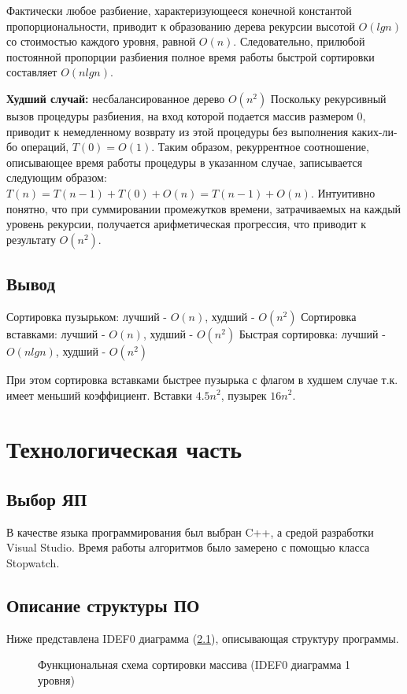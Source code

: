 \documentclass[12pt]{report}
\begin{document}
Фактически любое разбиение, характеризующееся конечной константой пропорциональности, приводит к образованию дерева рекурсии высотой $O(lgn)$ со стоимостью каждого уровня, равной $O(n)$. Следовательно, прилюбой постоянной пропорции разбиения полное время работы быстрой сортировки составляет $O(nlgn)$.

\textbf{Худший случай:} несбалансированное дерево $O(n^2)$
Поскольку рекурсивный вызов процедуры разбиения, на вход которой подается массив размером 0, приводит к немедленному возврату из этой процедуры без выполнения каких-ли-бо операций, $T(0) = O(1)$. Таким образом, рекуррентное соотношение, описывающее время работы процедуры в указанном случае, записывается следующим образом: 
$T(n) =T(n-1) +T(0) + O(n) =T(n-1) + O(n)$. Интуитивно понятно, что при суммировании промежутков времени, затрачиваемых на каждый уровень рекурсии, получается арифметическая прогрессия, что приводит к результату $O(n^2)$.

\section{Вывод}
Сортировка пузырьком: лучший - $O(n)$, худший - $O(n^2)$ \newline
Сортировка вставками: лучший - $O(n)$, худший - $O(n^2)$ \newline
Быстрая сортировка: лучший - $O(nlgn)$, худший - $O(n^2)$ \newline

При этом сортировка вставками быстрее пузырька с флагом в худшем случае т.к. имеет меньший коэффициент. Вставки $4.5n^2$, пузырек $16n^2$.


\chapter{Технологическая часть}
\section{Выбор ЯП}
В качестве языка программирования был выбран C++, а средой разработки Visual Studio.
Время работы алгоритмов было замерено с помощью класса Stopwatch.

\section{Описание структуры ПО}
Ниже представлена IDEF0 диаграмма (\ref{ris:imageIDEF}), описывающая структуру программы.
\begin{figure}[h]
\caption{Функциональная схема сортировки массива (IDEF0 диаграмма 1 уровня)}
\label{ris:imageIDEF}
\end{figure}
\end{document}
